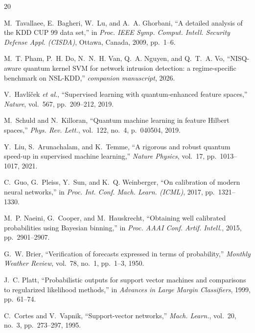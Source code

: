\documentclass[journal]{IEEEtran}
\begin{document}
\begin{thebibliography}{20}

M.~Tavallaee, E.~Bagheri, W.~Lu, and A.~A. Ghorbani,
``A detailed analysis of the KDD CUP 99 data set,'' in
\emph{Proc. IEEE Symp. Comput. Intell. Security Defense Appl. (CISDA)},
Ottawa, Canada, 2009, pp.~1--6.

M.~T. Pham, P.~H. Do, N.~N.~H. Van, Q.~A. Nguyen, and Q.~T.~A. Vo,
``NISQ-aware quantum kernel SVM for network intrusion detection: a
  regime-specific benchmark on NSL-KDD,'' \emph{companion manuscript},
  2026.

V.~Havl\'i\v{c}ek \emph{et al.},
``Supervised learning with quantum-enhanced feature spaces,''
\emph{Nature}, vol.~567, pp.~209--212, 2019.

M.~Schuld and N.~Killoran,
``Quantum machine learning in feature Hilbert spaces,''
\emph{Phys. Rev. Lett.}, vol.~122, no.~4, p.~040504, 2019.

Y.~Liu, S.~Arunachalam, and K.~Temme,
``A rigorous and robust quantum speed-up in supervised machine
  learning,'' \emph{Nature Physics}, vol.~17, pp.~1013--1017, 2021.

C.~Guo, G.~Pleiss, Y.~Sun, and K.~Q. Weinberger,
``On calibration of modern neural networks,'' in
\emph{Proc. Int. Conf. Mach. Learn. (ICML)}, 2017, pp.~1321--1330.

M.~P. Naeini, G.~Cooper, and M.~Hauskrecht,
``Obtaining well calibrated probabilities using Bayesian binning,''
in \emph{Proc. AAAI Conf. Artif. Intell.}, 2015, pp.~2901--2907.

G.~W. Brier,
``Verification of forecasts expressed in terms of probability,''
\emph{Monthly Weather Review}, vol.~78, no.~1, pp.~1--3, 1950.

J.~C. Platt,
``Probabilistic outputs for support vector machines and comparisons
  to regularized likelihood methods,'' in
\emph{Advances in Large Margin Classifiers}, 1999, pp.~61--74.

C.~Cortes and V.~Vapnik, ``Support-vector networks,''
\emph{Mach. Learn.}, vol.~20, no.~3, pp.~273--297, 1995.


\end{thebibliography}
\end{document}
